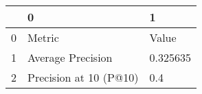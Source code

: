 \begin{tabular}{lll}
\toprule
{} &                       0 &         1 \\
\midrule
0 &                  Metric &     Value \\
1 &       Average Precision &  0.325635 \\
2 &  Precision at 10 (P@10) &       0.4 \\
\bottomrule
\end{tabular}
